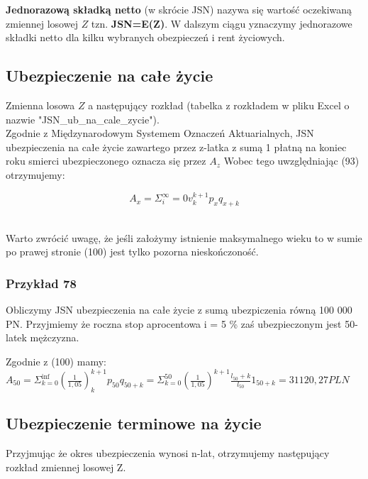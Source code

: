 \documentclass{article}
\begin{document}
\textbf{Jednorazową składką netto} (w skrócie JSN) nazywa się wartość oczekiwaną zmiennej losowej $ Z $ tzn. \textbf{JSN=E(Z)}. W dalszym ciągu yznaczymy jednorazowe składki netto dla kilku wybranych obezpieczeń i rent życiowych.

\subsection{Ubezpieczenie na całe życie}

Zmienna losowa $ Z $ a następujący rozkład (tabelka z rozkładem w pliku Excel o nazwie "JSN_ub_na_cale_zycie").\\

Zgodnie z Międzynarodowym Systemem Oznaczeń Aktuarialnych, JSN ubezpieczenia na całe życie zawartego przez z-latka z sumą 1 płatną na koniec roku smierci ubezpieczonego oznacza się przez \textbf{$ A_z $} Wobec tego uwzględniając (93) otrzymujemy:

\begin{center}
	\begin{equation}
		A_x = \Sigma ^{\infty}_i=0 v^{k+1} _kp_x q_{x+k}
	\end{equation}
\end{center}\\

Warto zwrócić uwagę, że jeśli założymy istnienie maksymalnego wieku to w sumie po prawej stronie (100) jest tylko pozorna nieskończoność.

\subsubsection{Przykład 78}

Obliczymy JSN ubezpieczenia na całe życie z sumą ubezpiczenia równą 100 000 PN. Przyjmiemy że roczna stop aprocentowa i = 5 \% zaś ubezpieczonym jest 50-latek mężczyzna.

Zgodnie z (100) mamy:\\

$ A_{50} = \Sigma ^{\inf}_{k=0}(\frac{1}{1,05})^{k+1} _kp_{50}q_{50+k} = \Sigma ^{50}_{k=0}(\frac{1}{1,05})^{k+1} \frac{l_{50}+k}{l_{50}}1_{50+k} =  31 120,27 PLN $\\

\subsection{Ubezpieczenie terminowe na życie}

Przyjmując że okres ubezpieczenia wynosi n-lat, otrzymujemy następujący rozkład zmiennej losowej Z.\\
\end{document}
